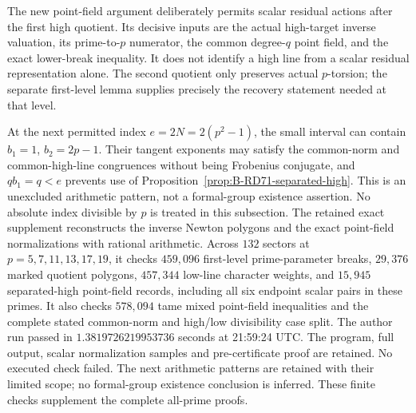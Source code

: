 \begin{remark}
\label{rem:B-RD71-scope}
The new point-field argument deliberately permits scalar
residual actions after the first high quotient.
Its decisive inputs are the actual high-target inverse
valuation, its prime-to-\(p\) numerator, the common degree-\(q\)
point field, and the exact lower-break inequality.
It does not identify a high line from a scalar residual
representation alone.
The second quotient only preserves actual \(p\)-torsion;
the separate first-level lemma supplies precisely the
recovery statement needed at that level.

At the next permitted index \(e=2N=2(p^2-1)\), the small
interval can contain \(b_1=1\), \(b_2=2p-1\).
Their tangent exponents may satisfy the common-norm and
common-high-line congruences without being Frobenius conjugate,
and \(q b_1=q<e\) prevents use of
Proposition~\ref{prop:B-RD71-separated-high}.
This is an unexcluded arithmetic pattern, not a formal-group
existence assertion. No absolute index divisible by \(p\)
is treated in this subsection.
The retained exact supplement
reconstructs the inverse Newton polygons and the exact
point-field normalizations with rational arithmetic.
Across \(132\) sectors at \(p=5,7,11,13,17,19\), it checks
\(459{,}096\) first-level prime-parameter breaks,
\(29{,}376\) marked quotient polygons,
\(457{,}344\) low-line character weights, and
\(15{,}945\) separated-high point-field records, including
all six endpoint scalar pairs in these primes.
It also checks \(578{,}094\) tame mixed point-field inequalities
and the complete stated common-norm and high/low divisibility
case split. The author run passed in
\(1.3819726219953736\) seconds at 21:59:24 UTC.
The program, full output, scalar normalization samples and
pre-certificate proof are retained. No executed check failed.
The next arithmetic patterns are retained with their limited
scope; no formal-group existence conclusion is inferred.
These finite checks supplement the complete all-prime proofs.
\end{remark}
